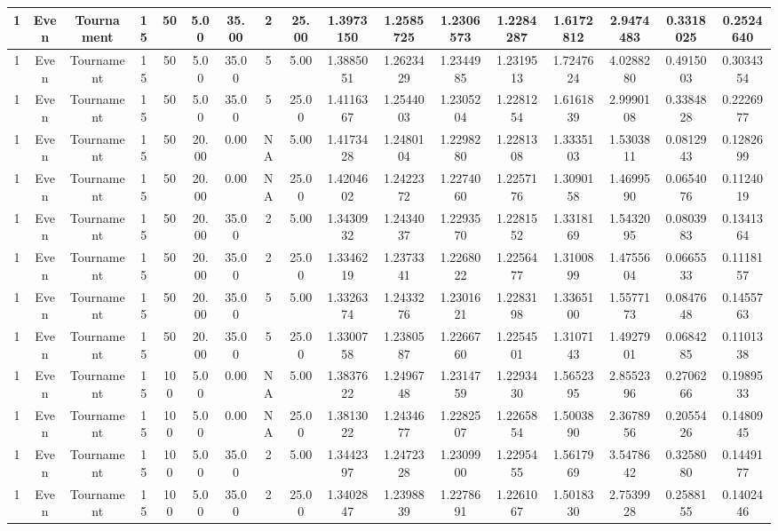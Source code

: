 \begin{longtable}{ | c | c | c | c | c | c | c | c | c | c | c | c | c | c | c | c | c | }
	\hline
	1	&	Even	&	Tournament	&	15	&	50	&	5.00	&	35.00	&	2	&	25.00	&	1.3973150	&	1.2585725	&	1.2306573	&	1.2284287	&	1.6172812	&	2.9474483	&	0.3318025	&	0.2524640 \\
	\hline
	1	&	Even	&	Tournament	&	15	&	50	&	5.00	&	35.00	&	5	&	5.00	&	1.3885051	&	1.2623429	&	1.2344985	&	1.2319513	&	1.7247624	&	4.0288280	&	0.4915003	&	0.3034354 \\
	\hline
	1	&	Even	&	Tournament	&	15	&	50	&	5.00	&	35.00	&	5	&	25.00	&	1.4116367	&	1.2544003	&	1.2305204	&	1.2281254	&	1.6161839	&	2.9990108	&	0.3384828	&	0.2226977 \\
	\hline
	1	&	Even	&	Tournament	&	15	&	50	&	20.00	&	0.00	&	NA	&	5.00	&	1.4173428	&	1.2480104	&	1.2298280	&	1.2281308	&	1.3335103	&	1.5303811	&	0.0812943	&	0.1282699 \\
	\hline
	1	&	Even	&	Tournament	&	15	&	50	&	20.00	&	0.00	&	NA	&	25.00	&	1.4204602	&	1.2422372	&	1.2274060	&	1.2257176	&	1.3090158	&	1.4699590	&	0.0654076	&	0.1124019 \\
	\hline
	1	&	Even	&	Tournament	&	15	&	50	&	20.00	&	35.00	&	2	&	5.00	&	1.3430932	&	1.2434037	&	1.2293570	&	1.2281552	&	1.3318169	&	1.5432095	&	0.0803983	&	0.1341364 \\
	\hline
	1	&	Even	&	Tournament	&	15	&	50	&	20.00	&	35.00	&	2	&	25.00	&	1.3346219	&	1.2373341	&	1.2268022	&	1.2256477	&	1.3100899	&	1.4755604	&	0.0665533	&	0.1118157 \\
	\hline
	1	&	Even	&	Tournament	&	15	&	50	&	20.00	&	35.00	&	5	&	5.00	&	1.3326374	&	1.2433276	&	1.2301621	&	1.2283198	&	1.3365100	&	1.5577173	&	0.0847648	&	0.1455763 \\
	\hline
	1	&	Even	&	Tournament	&	15	&	50	&	20.00	&	35.00	&	5	&	25.00	&	1.3300758	&	1.2380587	&	1.2266760	&	1.2254501	&	1.3107143	&	1.4927901	&	0.0684285	&	0.1101338 \\
	\hline
	1	&	Even	&	Tournament	&	15	&	100	&	5.00	&	0.00	&	NA	&	5.00	&	1.3837622	&	1.2496748	&	1.2314759	&	1.2293430	&	1.5652395	&	2.8552396	&	0.2706266	&	0.1989533 \\
	\hline
	1	&	Even	&	Tournament	&	15	&	100	&	5.00	&	0.00	&	NA	&	25.00	&	1.3813022	&	1.2434677	&	1.2282507	&	1.2265854	&	1.5003890	&	2.3678956	&	0.2055426	&	0.1480945 \\
	\hline
	1	&	Even	&	Tournament	&	15	&	100	&	5.00	&	35.00	&	2	&	5.00	&	1.3442397	&	1.2472328	&	1.2309900	&	1.2295455	&	1.5617969	&	3.5478642	&	0.3258080	&	0.1449177 \\
	\hline
	1	&	Even	&	Tournament	&	15	&	100	&	5.00	&	35.00	&	2	&	25.00	&	1.3402847	&	1.2398839	&	1.2278691	&	1.2261067	&	1.5018330	&	2.7539928	&	0.2588155	&	0.1402446 \\

\end{longtable}
